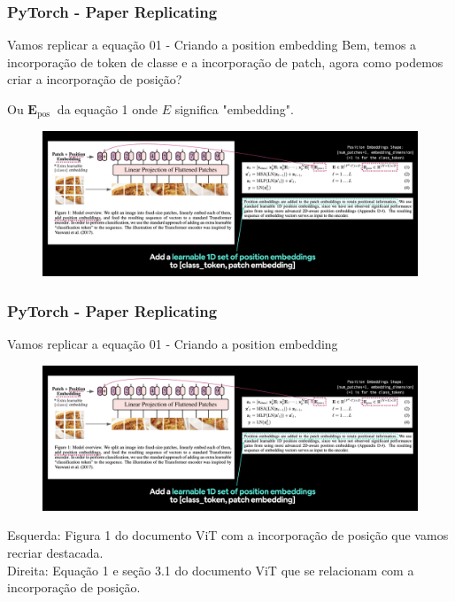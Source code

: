 \documentclass{beamer}
\begin{document}
\begin{frame}
	\frametitle{PyTorch - Paper Replicating}
	\begin{block}{Vamos replicar a equação 01 - Criando a position embedding}
		Bem, temos a incorporação de token de classe e a incorporação de patch, agora como podemos criar a incorporação de posição?
		
		Ou $\mathbf{E}_{\text {pos }}$ da equação 1 onde $E$ significa "embedding".
	\begin{figure}
		\centering
		\includegraphics[width=1\linewidth]{figures/position_embedding}
	\end{figure}
	\end{block}
\end{frame}
\begin{frame}
	\frametitle{PyTorch - Paper Replicating}
	\begin{block}{Vamos replicar a equação 01 - Criando a position embedding}
		\begin{figure}
			\centering
			\includegraphics[width=1\linewidth]{figures/position_embedding}
		\end{figure}
		
		Esquerda: Figura 1 do documento ViT com a incorporação de posição que vamos recriar destacada. \\ Direita: Equação 1 e seção 3.1 do documento ViT que se relacionam com a incorporação de posição.
	\end{block}
\end{frame}
\end{document}
